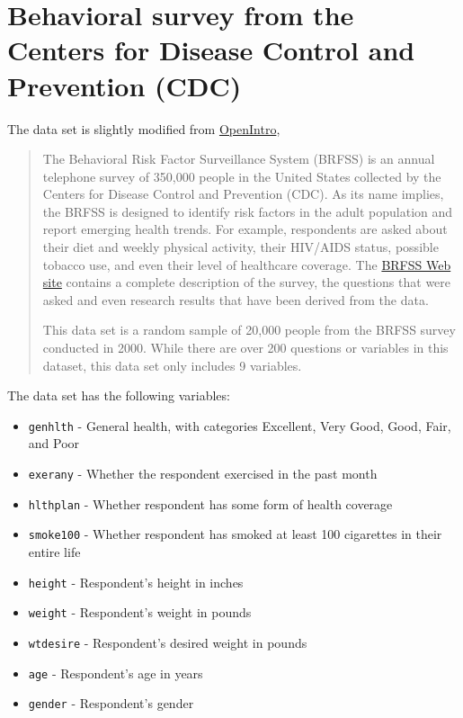 \documentclass[
  letterpaper,
  DIV=11,
  numbers=noendperiod]{scrreprt}
\begin{document}
\section{Behavioral survey from the Centers for Disease Control and
Prevention
(CDC)}\label{behavioral-survey-from-the-centers-for-disease-control-and-prevention-cdc}

The data set is slightly modified from
\href{https://www.openintro.org/book/statdata/?data=cdc}{OpenIntro},

\begin{quote}
The Behavioral Risk Factor Surveillance System (BRFSS) is an annual
telephone survey of 350,000 people in the United States collected by the
Centers for Disease Control and Prevention (CDC). As its name implies,
the BRFSS is designed to identify risk factors in the adult population
and report emerging health trends. For example, respondents are asked
about their diet and weekly physical activity, their HIV/AIDS status,
possible tobacco use, and even their level of healthcare coverage. The
\href{https://www.openintro.org/redirect.php?go=cdc_data_brfss&referrer=data_set_page}{BRFSS
Web site} contains a complete description of the survey, the questions
that were asked and even research results that have been derived from
the data.

This data set is a random sample of 20,000 people from the BRFSS survey
conducted in 2000. While there are over 200 questions or variables in
this dataset, this data set only includes 9 variables.
\end{quote}

The data set has the following variables:

\begin{itemize}
\item
  \texttt{genhlth} - General health, with categories Excellent, Very
  Good, Good, Fair, and Poor
\item
  \texttt{exerany} - Whether the respondent exercised in the past month
\item
  \texttt{hlthplan} - Whether respondent has some form of health
  coverage
\item
  \texttt{smoke100} - Whether respondent has smoked at least 100
  cigarettes in their entire life
\item
  \texttt{height} - Respondent's height in inches
\item
  \texttt{weight} - Respondent's weight in pounds
\item
  \texttt{wtdesire} - Respondent's desired weight in pounds
\item
  \texttt{age} - Respondent's age in years
\item
  \texttt{gender} - Respondent's gender
\end{itemize}
\end{document}
